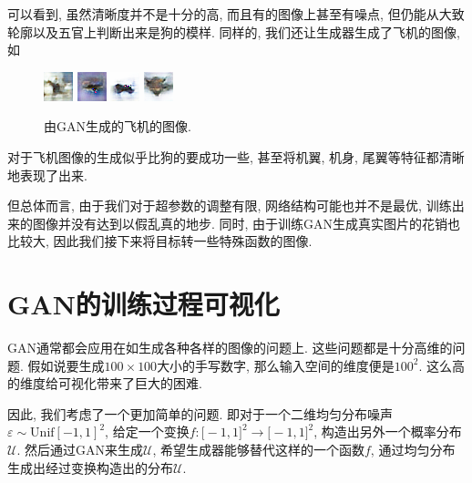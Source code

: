 \documentclass[lang=cn,11pt]{elegantpaper}
\begin{document}
\noindent 可以看到, 虽然清晰度并不是十分的高, 而且有的图像上甚至有噪点, 但仍能从大致轮廓以及五官上判断出来是狗的模样. 同样的, 我们还让生成器生成了飞机的图像, 如 
\begin{figure}[htbp]
  \centering
  \includegraphics[width=.2\textwidth]{air1}
  \includegraphics[width=.2\textwidth]{air2}
  \includegraphics[width=.2\textwidth]{air3}
  \includegraphics[width=.2\textwidth]{air4}
  \caption{由GAN生成的飞机的图像. \label{fig:air}}
\end{figure}
对于飞机图像的生成似乎比狗的要成功一些, 甚至将机翼, 机身, 尾翼等特征都清晰地表现了出来. 

但总体而言, 由于我们对于超参数的调整有限, 网络结构可能也并不是最优, 训练出来的图像并没有达到以假乱真的地步. 同时, 由于训练GAN生成真实图片的花销也比较大, 因此我们接下来将目标转一些特殊函数的图像. 
\section{GAN的训练过程可视化}

GAN通常都会应用在如生成各种各样的图像的问题上. 这些问题都是十分高维的问题. 假如说要生成$100\times 100$大小的手写数字, 那么输入空间的维度便是$100^2$. 这么高的维度给可视化带来了巨大的困难. 

因此, 我们考虑了一个更加简单的问题. 即对于一个二维均匀分布噪声$\varepsilon \sim \mathrm{Unif}[-1,1]^2$, 给定一个变换$f:\mathbb [-1,1]^2 \to \mathbb [-1,1]^2$, 构造出另外一个概率分布$\mathcal U$. 然后通过GAN来生成$\mathcal U$, 希望生成器能够替代这样的一个函数$f$, 通过均匀分布生成出经过变换构造出的分布$\mathcal U$.
\end{document}
